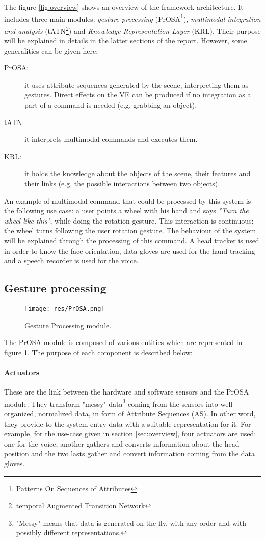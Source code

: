 \documentclass[a4paper]{article}
\begin{document}
The figure \ref{fig:overview} shows an overview of the framework architecture. It includes three main modules: \textit{gesture processing} (PrOSA\footnote{Patterns On Sequences of Attributes}), \textit{multimodal integration and analysis} (tATN\footnote{temporal Augmented Transition Network}) and \textit{Knowledge Representation Layer} (KRL). Their purpose will be explained in details in the latter sections of the report. However, some generalities can be given here:
\begin{description}
	\item[PrOSA:] it uses attribute sequences generated by the scene, interpreting them as gestures. Direct effects on the VE can be produced if no integration as a part of a command is needed (e.g, grabbing an object).
	\item[tATN:] it interprets multimodal commands and executes them.
	\item[KRL:] it holds the knowledge about the objects of the scene, their features and their links (e.g, the possible interactions between two objects).
\end{description}

An example of multimodal command that could be processed by this system is the following use case: a user points a wheel with his hand and says \textit{"Turn the wheel like this"}, while doing the rotation gesture. This interaction is continuous: the wheel turns following the user rotation gesture. The behaviour of the system will be explained through the processing of this command. A head tracker is used in order to know the face orientation, data gloves are used for the hand tracking and a speech recorder is used for the voice.

\subsection{Gesture processing}

\begin{figure}
\centering
\texttt{[image: res/PrOSA.png]}
\caption{\label{fig:PrOSA}Gesture Processing module.}
\end{figure}

The PrOSA module is composed of various entities which are represented in figure \ref{fig:PrOSA}. The purpose of each component is described below:

\paragraph{Actuators} These are the link between the hardware and software sensors and the PrOSA module. They transform "messy" data\footnote{"Messy" means that data is generated on-the-fly, with any order and with possibly different representations.} coming from the sensors into well organized, normalized data, in form of Attribute Sequences (AS). In other word, they provide to the system entry data with a suitable representation for it. For example, for the use-case given in section \ref{sec:overview}, four actuators are used: one for the voice, another gathers and converts information about the head position and the two lasts gather and convert information coming from the data gloves.
\end{document}
